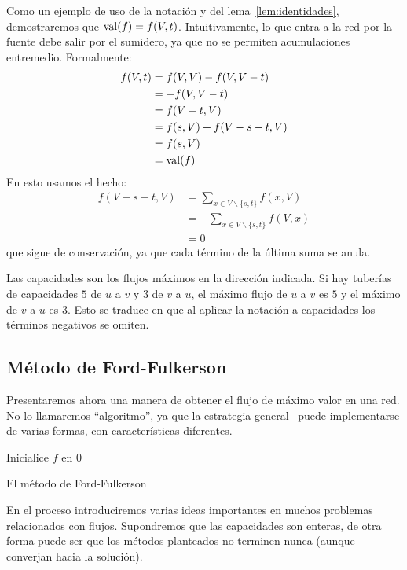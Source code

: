   Como un ejemplo de uso de la notación
  y del lema~\ref{lem:identidades},
  demostraremos que \(\operatorname{val}(f) = f(V, t)\).
  Intuitivamente,
  lo que entra a la red por la fuente debe salir por el sumidero,
  ya que no se permiten acumulaciones entremedio.
  Formalmente:
  \begin{align*}
    f(V, t)
      & = f(V, V) - f(V, V - t) \\
      & = -f(V, V - t) \\
      & = f(V - t, V) \\
      & = f(s, V) + f(V - s - t, V) \\
      & = f(s, V) \\
      &= \operatorname{val}(f)
  \end{align*}
  En esto usamos el hecho:
  \begin{align*}
    f(V - s - t, V)
      &= \sum_{x \in V \smallsetminus \{s, t\}} f(x, V) \\
      &= -\sum_{x \in V \smallsetminus \{s, t\}} f(V, x) \\
      &= 0
  \end{align*}
  que sigue de conservación,
  ya que cada término de la última suma se anula.

  Las capacidades son los flujos máximos en la dirección indicada.
  Si hay tuberías de capacidades \(5\) de \(u\) a \(v\)
  y \(3\) de \(v\) a \(u\),
  el máximo flujo de \(u\) a \(v\) es \(5\)
  y el máximo de \(v\) a \(u\) es \(3\).
  Esto se traduce en que al aplicar la notación a capacidades
  los términos negativos se omiten.

\subsection{Método de Ford-Fulkerson}
\label{sec:ford-fulkerson}

  Presentaremos ahora una manera de obtener el flujo de máximo valor
  en una red.
  No lo llamaremos ``algoritmo'',
  ya que la estrategia general~%
    \cite{ford56:_max_flow_networks}
  puede implementarse de varias formas,
  con características diferentes.
  \begin{algorithm}[htbp]
    \DontPrintSemicolon

    Inicialice \(f\) en \(0\) \;
    \caption{El método de Ford-Fulkerson}
    \label{alg:ford-fulkerson}
  \end{algorithm}
  En el proceso introduciremos varias ideas importantes
  en muchos problemas relacionados con flujos.
  Supondremos que las capacidades son enteras,
  de otra forma puede ser que los métodos planteados
  no terminen nunca
  (aunque converjan hacia la solución).

